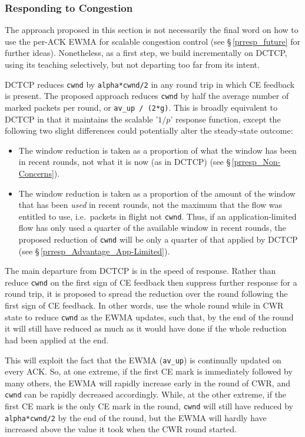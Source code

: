 \subsubsection{Responding to Congestion}\label{prresp_congestion_response}

The approach proposed in this section is not necessarily the final word on how
to use the per-ACK EWMA for scalable congestion control (see
\S\,\ref{prresp_future} for further ideas). Nonetheless, as a first step, we
build incrementally on DCTCP, using its teaching selectively, but not departing
too far from its intent. 

DCTCP reduces \texttt{cwnd} by \texttt{alpha*cwnd/2} in any round trip in which
CE feedback is present. The proposed approach reduces \texttt{cwnd} by half the
average number of marked packets per round, or \texttt{av\_up / (2*g)}. This is
broadly equivalent to DCTCP in that it maintains the scalable '\(1/p\)' response
function, except the following two slight differences could potentially alter
the steady-state outcome:
\begin{itemize}[nosep]
	\item The window reduction is taken as a proportion of what the window has been
	in recent rounds, not what it is now (as in DCTCP) (see
	\S\,\ref{prresp_Non-Concerns}).
	\item The window reduction is taken as a proportion of the amount of the window
	that has been \emph{used} in recent rounds, not the maximum that the flow was
	entitled to use, i.e.\ packets in flight not \texttt{cwnd}. Thus, if an
	application-limited flow has only used a quarter of the available window in
	recent rounds, the proposed reduction of \texttt{cwnd} will be only a quarter of
	that applied by DCTCP (see \S\,\ref{prresp_Advantage_App-Limited}).
\end{itemize}

The main departure from DCTCP is in the speed of response. Rather than reduce 
\texttt{cwnd} on the first sign of CE feedback then suppress further response
for a round trip, it is proposed to spread the reduction over the round
following the first sign of CE feedback. In other words, use the whole round
while in CWR state to reduce \texttt{cwnd} as the EWMA updates, such that, by
the end of the round it will still have reduced as much as it would have done if
the whole reduction had been applied at the end. 

This will exploit the fact that the EWMA (\texttt{av\_up}) is continually
updated on every ACK. So, at one extreme, if the first CE mark is immediately
followed by many others, the EWMA will rapidly increase early in the round of
CWR, and \texttt{cwnd} can be rapidly decreased accordingly. While, at the other
extreme, if the first CE mark is the only CE mark in the round, \texttt{cwnd}
will still have reduced by \texttt{alpha*cwnd/2} by the end of the round, but
the EWMA will hardly have increased above the value it took when the CWR round
started. 

